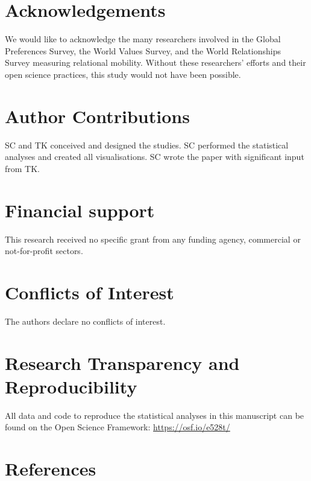 \documentclass[
  man,floatsintext]{apa6}
\begin{document}
\newpage

\hypertarget{acknowledgements}{%
\section{Acknowledgements}\label{acknowledgements}}

We would like to acknowledge the many researchers involved in the Global Preferences Survey, the World Values Survey, and the World Relationships Survey measuring relational mobility. Without these researchers' efforts and their open science practices, this study would not have been possible.

\hypertarget{author-contributions}{%
\section{Author Contributions}\label{author-contributions}}

SC and TK conceived and designed the studies. SC performed the statistical analyses and created all visualisations. SC wrote the paper with significant input from TK.

\hypertarget{financial-support}{%
\section{Financial support}\label{financial-support}}

This research received no specific grant from any funding agency, commercial or not-for-profit sectors.

\hypertarget{conflicts-of-interest}{%
\section{Conflicts of Interest}\label{conflicts-of-interest}}

The authors declare no conflicts of interest.

\hypertarget{research-transparency-and-reproducibility}{%
\section{Research Transparency and Reproducibility}\label{research-transparency-and-reproducibility}}

All data and code to reproduce the statistical analyses in this manuscript can be found on the Open Science Framework: \url{https://osf.io/e528t/}

\newpage

\hypertarget{references}{%
\section{References}\label{references}}
\end{document}
